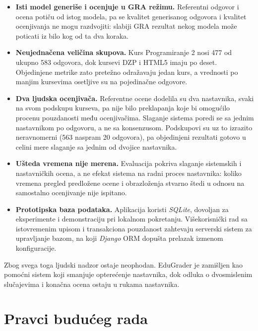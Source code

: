 \begin{itemize}
    GRA vrednosti ta dva modela zato nisu uporedive sa vrednostima modela porodice GPT,
    a zaključak o prednosti modela za rezonovanje u GRA režimu oslanja se na GPT-5 i na četiri manja kursa.
    Rešenje je izdvajanje relevantnog odlomka udžbenika pre generisanja, o čemu je reč među pravcima budućeg rada.
    \item \textbf{Isti model generiše i ocenjuje u GRA režimu.}
    Referentni odgovor i ocena potiču od istog modela, pa se kvalitet generisanog odgovora i kvalitet ocenjivanja ne mogu razdvojiti:
    slabiji GRA rezultat nekog modela može poticati iz bilo kog od ta dva koraka.
    \item \textbf{Neujednačena veličina skupova.} Kurs Programiranje 2 nosi 477 od ukupno 583 odgovora, dok kursevi DZP i HTML5 imaju po deset.
    Objedinjene metrike zato pretežno odražavaju jedan kurs, a vrednosti po manjim kursevima osetljive su na pojedinačne odgovore.
    \item \textbf{Dva ljudska ocenjivača.} Referentne ocene dodelila su dva nastavnika, svaki na svom podskupu kurseva,
    pa nije bilo preklapanja koje bi omogućilo procenu pouzdanosti među ocenjivačima.
    Slaganje sistema poredi se sa jednim nastavnikom po odgovoru, a ne sa konsenzusom.
    Podskupovi su uz to izrazito neravnomerni (563 naspram 20 odgovora),
    pa objedinjeni rezultati gotovo u celini mere slaganje sa jednim od dvojice nastavnika.
    \item \textbf{Ušteda vremena nije merena.}
    Evaluacija pokriva slaganje sistemskih i nastavničkih ocena, a ne efekat sistema na radni proces nastavnika:
    koliko vremena pregled predložene ocene i obrazloženja stvarno štedi u odnosu na samostalno ocenjivanje nije ispitano.
    \item \textbf{Prototipska baza podataka.}
    Aplikacija koristi \emph{SQLite}, dovoljan za eksperimente i demonstraciju pri lokalnom pokretanju.
    Višekorisnički rad sa istovremenim upisom i transakciona pouzdanost zahtevaju serverski sistem za upravljanje bazom,
    na koji \emph{Django} ORM dopušta prelazak izmenom konfiguracije.
\end{itemize}

Zbog svega toga ljudski nadzor ostaje neophodan.
EduGrader je zamišljen kao pomoćni sistem koji smanjuje opterećenje nastavnika,
dok odluka o dvosmislenim slučajevima i konačna ocena ostaju u rukama nastavnika.

\section{Pravci budućeg rada}
\label{sec:buduci-rad}

